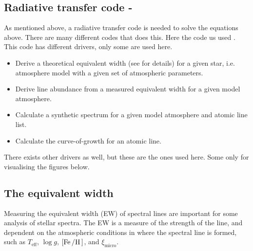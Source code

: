\subsection{Radiative transfer code - \MOOG}

As mentioned above, a radiative transfer code is needed to solve the equations
above. There are many different codes that does this. Here the \MOOG code us
used \citep{Sneden1973}. This code has different drivers, only some are used
here.

\begin{itemize}
  \item Derive a theoretical equivalent width (see  for details)
        for a given star, i.e. atmosphere model with a given set of atmospheric
        parameters.
  \item Derive line abundance from a measured equivalent width for a given model
        atmosphere.
  \item Calculate a synthetic spectrum for a given model atmosphere and atomic
        line list.
  \item Calculate the curve-of-growth for an atomic line.
\end{itemize}
There exists other drivers as well, but these are the ones used here. Some only
for visualising the figures below.



\subsection{The equivalent width}
\label{sec:EW}

Measuring the equivalent width (EW) of spectral lines are important for some
analysis of stellar spectra. The EW is a measure of the strength of the line,
and dependent on the atmospheric conditions in where the spectral line is
formed, such as $T_\mathrm{eff}$, $\log g$, $[\ion{Fe}/\ion{H}]$, and
$\xi_\mathrm{micro}$.

